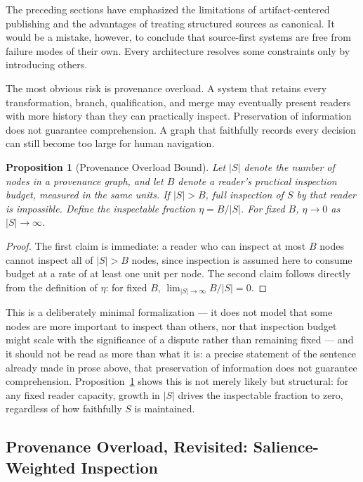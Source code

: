 \documentclass[11pt]{article}
\newtheorem{proposition}[theorem]{Proposition}
\theoremstyle{definition}
\begin{document}
The preceding sections have emphasized the limitations of artifact-centered publishing and the advantages of treating structured sources as canonical. It would be a mistake, however, to conclude that source-first systems are free from failure modes of their own. Every architecture resolves some constraints only by introducing others.

The most obvious risk is provenance overload. A system that retains every transformation, branch, qualification, and merge may eventually present readers with more history than they can practically inspect. Preservation of information does not guarantee comprehension. A graph that faithfully records every decision can still become too large for human navigation.

\begin{proposition}[Provenance Overload Bound]
\label{prop:overload-bound}
Let $|S|$ denote the number of nodes in a provenance graph, and let $B$ denote a reader's practical inspection budget, measured in the same units. If $|S| > B$, full inspection of $S$ by that reader is impossible. Define the \emph{inspectable fraction} $\eta = B / |S|$. For fixed $B$, $\eta \to 0$ as $|S| \to \infty$.
\end{proposition}

\begin{proof}
The first claim is immediate: a reader who can inspect at most $B$ nodes cannot inspect all of $|S| > B$ nodes, since inspection is assumed here to consume budget at a rate of at least one unit per node. The second claim follows directly from the definition of $\eta$: for fixed $B$, $\lim_{|S|\to\infty} B/|S| = 0$.
\end{proof}

This is a deliberately minimal formalization --- it does not model that some nodes are more important to inspect than others, nor that inspection budget might scale with the significance of a dispute rather than remaining fixed --- and it should not be read as more than what it is: a precise statement of the sentence already made in prose above, that preservation of information does not guarantee comprehension. Proposition~\ref{prop:overload-bound} shows this is not merely likely but structural: for any fixed reader capacity, growth in $|S|$ drives the inspectable fraction to zero, regardless of how faithfully $S$ is maintained.

\subsection{Provenance Overload, Revisited: Salience-Weighted Inspection}
\label{sec:overload-revisited}
\end{document}
